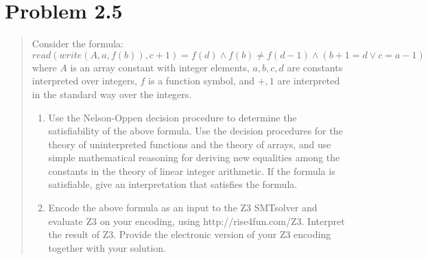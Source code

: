 \documentclass[11pt,a4paper]{article}
\begin{document}
\section*{Problem 2.5}
\begin{quote}
Consider the formula:
\begin{equation*}
read(write(A, a, f (b)), c + 1) = f (d) \land f (b) \neq f (d - 1) \land (b + 1 = d \lor c = a - 1)
\end{equation*}
where $A$ is an array constant with integer elements, $a, b, c, d$ are constants interpreted over integers, $f$ is a function symbol, and $+,1$ are interpreted in the standard way over the integers.
\begin{enumerate}
\item Use the Nelson-Oppen decision procedure to determine the satisfiability of the above formula.
Use the decision procedures for the theory of uninterpreted functions and the theory of arrays,
and use simple mathematical reasoning for deriving new equalities among the constants in the
theory of linear integer arithmetic. If the formula is satisfiable, give an interpretation that satisfies the formula.

\item Encode the above formula as an input to the Z3 SMTsolver and evaluate Z3 on your encoding,
using http://rise4fun.com/Z3. Interpret the result of Z3. Provide the electronic version
of your Z3 encoding together with your solution.

\end{enumerate}
\end{quote}
\end{document}
